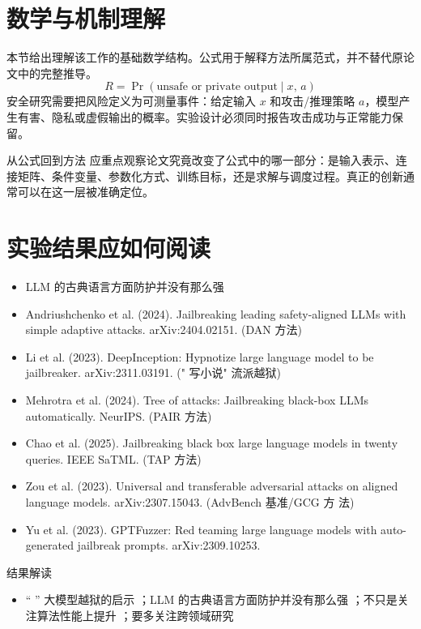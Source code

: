 \documentclass[UTF8,11pt,a4paper]{ctexart}
\begin{document}
\section{数学与机制理解}
本节给出理解该工作的基础数学结构。公式用于解释方法所属范式，并不替代原论文中的完整推导。
\begin{equation}
R=\Pr(\text{unsafe or private output}\mid x,\,a)
\end{equation}
安全研究需要把风险定义为可测量事件：给定输入 $x$ 和攻击/推理策略 $a$，模型产生有害、隐私或虚假输出的概率。实验设计必须同时报告攻击成功与正常能力保留。

\begin{keybox}{从公式回到方法}
应重点观察论文究竟改变了公式中的哪一部分：是输入表示、连接矩阵、条件变量、参数化方式、训练目标，还是求解与调度过程。真正的创新通常可以在这一层被准确定位。
\end{keybox}


\section{实验结果应如何阅读}
\begin{itemize}
\item LLM 的古典语言方面防护并没有那么强
\item Andriushchenko et al. (2024). Jailbreaking leading safety-aligned LLMs with simple adaptive attacks. arXiv:2404.02151. (DAN 方法)
\item Li et al. (2023). DeepInception: Hypnotize large language model to be jailbreaker. arXiv:2311.03191. (" 写小说" 流派越狱)
\item Mehrotra et al. (2024). Tree of attacks: Jailbreaking black-box LLMs automatically. NeurIPS. (PAIR 方法)
\item Chao et al. (2025). Jailbreaking black box large language models in twenty queries. IEEE SaTML. (TAP 方法)
\item Zou et al. (2023). Universal and transferable adversarial attacks on aligned language models. arXiv:2307.15043. (AdvBench 基准/GCG 方 法)
\item Yu et al. (2023). GPTFuzzer: Red teaming large language models with auto-generated jailbreak prompts. arXiv:2309.10253.
\end{itemize}

\begin{notebox}{结果解读}
\begin{itemize}
\item “ ” 大模型越狱的启示 ；LLM 的古典语言方面防护并没有那么强 ；不只是关注算法性能上提升 ；要多关注跨领域研究
\end{itemize}
\end{notebox}
\end{document}
